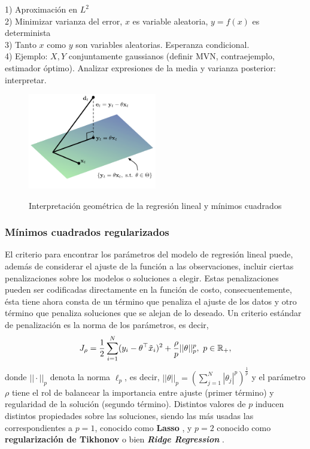 \begin{mdframed}[style=pendiente, frametitle={\center ¿Por qué usamos el criterio de mínimos cuadrados?}]
1) Aproximación en $L^2$\\
2) Minimizar varianza del error, $x$ es variable aleatoria, $y=f(x)$ es determinista\\
3) Tanto $x$ como $y$ son variables aleatorias. Esperanza condicional.\\
4) Ejemplo: $X,Y$ conjuntamente gaussianos (definir MVN, contraejemplo, estimador óptimo). Analizar expresiones de la media y varianza posterior: interpretar.
\end{mdframed}


\begin{figure}[ht]
	\centering
	\includegraphics[width=0.5\textwidth]{img/projection.pdf}\\
	\caption{Interpretación geométrica de la regresión lineal y mínimos cuadrados}
	\label{fig:projection}
\end{figure}


\subsubsection{Mínimos cuadrados regularizados} %
\label{ssub:min_cuad_reg}

El criterio para encontrar los parámetros del modelo de regresión lineal puede, además de considerar el ajuste de la función a las observaciones, incluir ciertas penalizaciones sobre los modelos o soluciones a elegir. Estas penalizaciones pueden ser codificadas directamente en la función de costo, consecuentemente, ésta tiene ahora consta de un término que penaliza el ajuste de los datos y otro término que penaliza soluciones que se alejan de lo deseado. Un criterio estándar de penalización es la norma de los parámetros, es decir, 
\begin{equation}
	J_\rho = \frac{1}{2}\sum_{i=1}^N(y_i-\theta^
	\top \tilde{x}_i)^2 + \frac{\rho}{p}||\theta||_p^p,\ p\in{\mathbb R}_+,
	\label{eq:reg_least_squares}
\end{equation} 
donde $||\cdot||_p$ denota la norma $\ell_p$, es decir, $||\theta||_p=\left(\sum_{j=1}^N|\theta_j|^p\right)^\frac{1}{p}$ y el parámetro $\rho$ tiene el rol de balancear la importancia entre ajuste (primer término) y regularidad de la solución (segundo término). Distintos valores de $p$ inducen distintos propiedades sobre las soluciones, siendo las más usadas las correspondientes a $p=1$, conocido como \textbf{Lasso} \cite{tibshirani_1996}, y $p=2$ conocido como \textbf{regularización de Tikhonov} \cite{tikhonov_arsenin_1977} o bien \textbf{\emph{Ridge Regression}} \cite{hoerl_kennard_1970}.  


